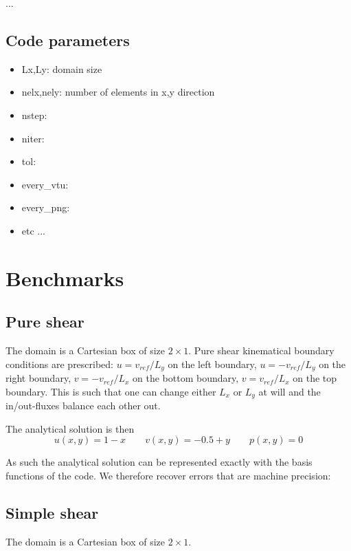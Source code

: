 \documentclass[a4paper]{article}
\newcommand{\python}{\color{darkgray} \sffamily }
\begin{document}
...

\subsection{Code parameters}

\begin{itemize}
\item {\python Lx,Ly}: domain size
\item {\python nelx,nely}: number of elements in x,y direction 
\item {\python nstep}:
\item {\python niter}:
\item {\python tol}:
\item {\python every\_vtu}:
\item {\python every\_png}:
\item etc ...
\end{itemize}



\newpage
\section{Benchmarks}

\subsection{Pure shear}

The domain is a Cartesian box of size $2\times 1$.
Pure shear kinematical boundary conditions are prescribed:
$u=v_{ref}/L_y$ on the left boundary, 
$u=-v_{ref}/L_y$ on the right boundary, 
$v=-v_{ref}/L_x$ on the bottom boundary, 
$v=v_{ref}/L_x$ on the top boundary.
This is such that one can change either $L_x$ or $L_y$
at will and the in/out-fluxes balance each other out. 

The analytical solution is then
\[
u(x,y)=1-x
\qquad
v(x,y)=-0.5+y
\qquad
p(x,y)=0
\]

As such the analytical solution can be represented exactly
with the basis functions of the code.
We therefore recover errors that are machine precision:


\subsection{Simple shear}

The domain is a Cartesian box of size $2\times 1$.
\end{document}
